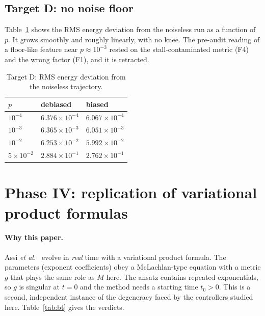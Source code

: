 \documentclass[aps,pra,reprint,superscriptaddress,nofootinbib]{revtex4-2}
\begin{document}
\subsection{Target D: no noise floor}

Table~\ref{tab:targetD} shows the RMS energy deviation from the noiseless run as a function of
$p$. It grows smoothly and roughly linearly, with no knee. The pre-audit reading of a
floor-like feature near $p\approx10^{-3}$ rested on the stall-contaminated metric (F4) and
the wrong factor (F1), and it is retracted.

\begin{table}[t]
\caption{Target D: RMS energy deviation from the noiseless trajectory.}
\label{tab:targetD}
\begin{ruledtabular}
\begin{tabular}{lll}
$p$ & debiased & biased \\
\midrule
$10^{-4}$ & $6.376\times10^{-4}$ & $6.067\times10^{-4}$ \\
$10^{-3}$ & $6.365\times10^{-3}$ & $6.051\times10^{-3}$ \\
$10^{-2}$ & $6.253\times10^{-2}$ & $5.992\times10^{-2}$ \\
$5\times10^{-2}$ & $2.884\times10^{-1}$ & $2.762\times10^{-1}$ \\
\end{tabular}
\end{ruledtabular}
\end{table}

\section{Phase IV: replication of variational product formulas}
\label{sec:phase4}

\paragraph*{Why this paper.} Assi \emph{et al.}~\cite{BeyondTrot2026} evolve in \emph{real} time
with a variational product formula. The parameters (exponent coefficients) obey a
McLachlan-type equation with a metric $g$ that plays the same role as $M$ here. The ansatz
contains repeated exponentials, so $g$ is singular at $t=0$ and the method needs a starting
time $t_0>0$. This is a second, independent instance of the degeneracy faced by the controllers studied here.
Table~\ref{tab:bt} gives the verdicts.
\end{document}
